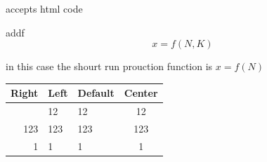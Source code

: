 \documentclass[
  letterpaper,
  DIV=11,
  numbers=noendperiod]{scrartcl}
\begin{document}
accepts html code

addf \[
x=f(N,K)
\]

in this case the shourt run prouction function is \(x=f(N)\)

\begin{longtable}[]{@{}rllc@{}}
\toprule\noalign{}
Right & Left & Default & Center \\
\midrule\noalign{}
\endhead
\bottomrule\noalign{}
\endlastfoot
12 & 12 & 12 & 12 \\
123 & 123 & 123 & 123 \\
1 & 1 & 1 & 1 \\
\end{longtable}
\end{document}
